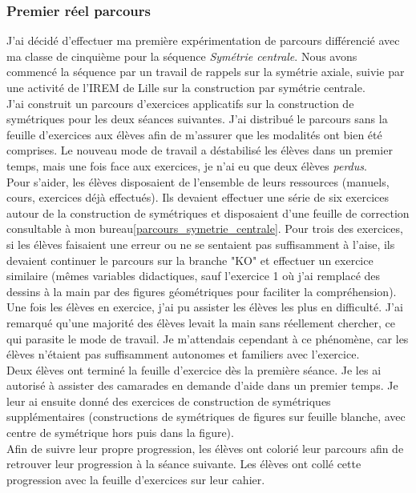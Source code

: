 \subsubsection*{Premier réel parcours}
J'ai décidé d'effectuer ma première expérimentation de parcours différencié avec ma classe de cinquième pour la séquence \emph{Symétrie centrale}. Nous avons commencé la séquence par un travail de rappels sur la symétrie axiale, suivie par une activité de l'IREM de Lille sur la construction par symétrie centrale.\\
J'ai construit un parcours d'exercices applicatifs sur la construction de symétriques pour les deux séances suivantes. J'ai distribué le parcours sans la feuille d'exercices aux élèves afin de m'assurer que les modalités ont bien été comprises. Le nouveau mode de travail a déstabilisé les élèves dans un premier temps, mais une fois face aux exercices, je n'ai eu que deux élèves \textit{perdus}.\\
Pour s'aider, les élèves disposaient de l'ensemble de leurs ressources (manuels, cours, exercices déjà effectués). Ils devaient effectuer une série de six exercices autour de la construction de symétriques et disposaient d'une feuille de correction consultable à mon bureau\ref{parcours_symetrie_centrale}. Pour trois des exercices, si les élèves faisaient une erreur ou ne se sentaient pas suffisamment à l'aise, ils devaient continuer le parcours sur la branche "KO" et effectuer un exercice similaire (mêmes variables didactiques, sauf l'exercice 1 où j'ai remplacé des dessins à la main par des figures géométriques pour faciliter la compréhension).\\
Une fois les élèves en exercice, j'ai pu assister les élèves les plus en difficulté. J'ai remarqué qu'une majorité des élèves levait la main sans réellement chercher, ce qui parasite le mode de travail. Je m'attendais cependant à ce phénomène, car les élèves n'étaient pas suffisamment autonomes et familiers avec l'exercice.\\
Deux élèves ont terminé la feuille d'exercice dès la première séance. Je les ai autorisé à assister des camarades en demande d'aide dans un premier temps. Je leur ai ensuite donné des exercices de construction de symétriques supplémentaires (constructions de symétriques de figures sur feuille blanche, avec centre de symétrique hors puis dans la figure).\\
Afin de suivre leur propre progression, les élèves ont colorié leur parcours afin de retrouver leur progression à la séance suivante. Les élèves ont collé cette progression avec la feuille d'exercices sur leur cahier.\\
